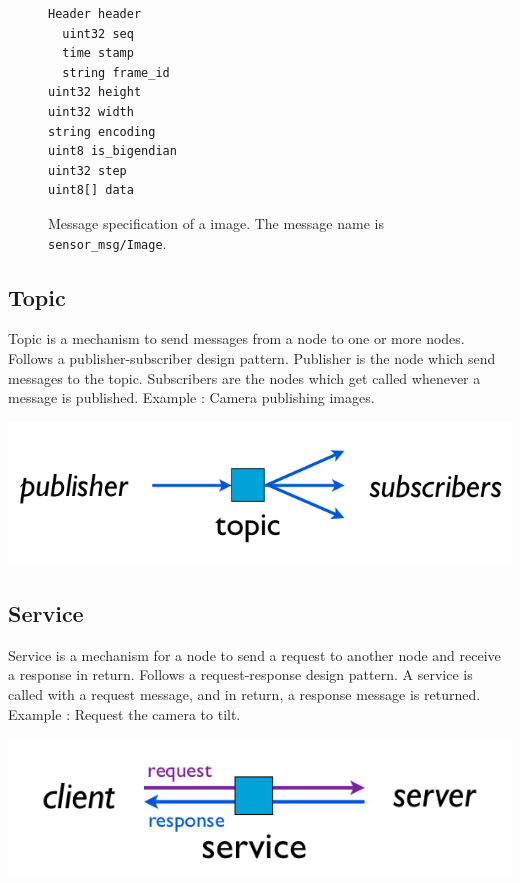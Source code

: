 \documentclass[a4paper, 10pt, conference]{ieeeconf}       %
\begin{document}
\begin{figure}[htpb]
  \centering
\begin{Verbatim}[frame=single]
Header header 
  uint32 seq 
  time stamp 
  string frame_id 
uint32 height 
uint32 width 
string encoding 
uint8 is_bigendian 
uint32 step 
uint8[] data
\end{Verbatim}
  \caption{Message specification of a image. The message name is \texttt{sensor\_msg/Image}.}
  \label{fig:message}
\end{figure}

\subsection{Topic}


Topic is a mechanism to send messages from a node to one or more nodes.
   Follows a publisher-subscriber design pattern.
   Publisher is the node which send messages to the topic.
   Subscribers are the nodes which get called whenever a message is published.
   Example : Camera publishing images.


\begin{center}
  \includegraphics[width=.6\textwidth]{topic}
\end{center}




\subsection{Service}


   Service is a mechanism for a node to send a request to another node and receive a response in return.
   Follows a request-response design pattern.
   A service is called with a request message, and in return, a response message is returned.
   Example : Request the camera to tilt.


\begin{center}
  \includegraphics[width=.6\textwidth]{service}
\end{center}
\end{document}
